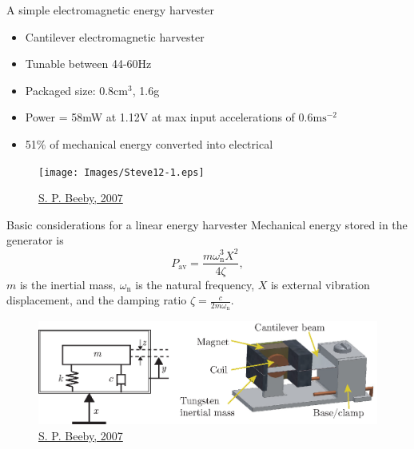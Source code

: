 \documentclass[LaTeX2e,10pt]{beamer}
\begin{document}
\begin{frame}{A simple electromagnetic energy harvester}
\begin{itemize}
\item Cantilever electromagnetic harvester
\item Tunable between 44-60Hz
\item Packaged size: 0.8$\mathrm{cm}^3$, 1.6g
\item Power = 58mW at 1.12V at max input accelerations of 0.6$\mathrm{ms}^{-2}$
\item 51$\%$ of mechanical energy converted into electrical
\end{itemize}
\vskip-15pt
\begin{figure}
	\texttt{[image: Images/Steve12-1.eps]}
	\caption{\href{https://eprints.soton.ac.uk/264798/1/jmm7_7_007_-_microgenerator.pdf}{S. P. Beeby, 2007}}
\end{figure}
\end{frame}
\begin{frame}{Basic considerations for a linear energy harvester}
Mechanical energy stored in the generator is
\begin{equation}
P_\mathrm{av} = \frac{m \omega_\mathrm{n}^3 X^2}{4 \zeta},
\end{equation}
$m$ is the inertial mass, $\omega_\mathrm{n}$ is the natural frequency, $X$ is external vibration displacement, and the damping ratio $\zeta=\frac{c}{2m\omega_\mathrm{n}}$. 
\begin{figure}
	\centering
	\includegraphics[width=\linewidth]{Images/Steve12.eps}
	\caption{\href{https://eprints.soton.ac.uk/264798/1/jmm7_7_007_-_microgenerator.pdf}{S. P. Beeby, 2007}}
\end{figure}
\end{frame}
\end{document}
